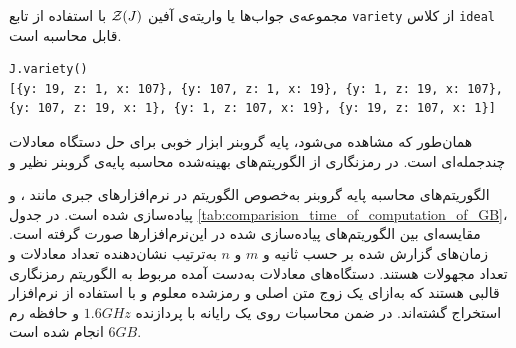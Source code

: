 \begin{example}
	مجموعه‌ی جواب‌ها یا واریته‌ی آفین 
${\mathcal Z}(J)$
	با استفاده از تابع 
\verb|variety|
	از کلاس 
\verb|ideal|
	قابل محاسبه است.
\begin{latin}
\begin{lstlisting}
J.variety()
[{y: 19, z: 1, x: 107}, {y: 107, z: 1, x: 19}, {y: 1, z: 19, x: 107},
{y: 107, z: 19, x: 1}, {y: 1, z: 107, x: 19}, {y: 19, z: 107, x: 1}]
\end{lstlisting}
\end{latin}	
\end{example}
همان‌طور که مشاهده می‌شود، پایه‌  گروبنر ابزار خوبی برای حل دستگاه‌ معادلات چندجمله‌ای است. در رمزنگاری از الگوریتم‌های بهینه‌شده محاسبه‌  پایه‌ی گروبنر  نظیر 
و

الگوریتم‌های محاسبه پایه گروبنر به‌خصوص  الگوریتم 
در نرم‌افزارهای جبری مانند 
\cite{Maple}، 
\cite{DGPS}
و 
\cite{ApCoCoA}
پیاده‌سازی شده است.  در جدول 
\ref{tab:comparision_time_of_computation_of_GB}، 
مقایسه‌ای بین الگوریتم‌های پیاده‌سازی شده در این‌نرم‌افزارها صورت گرفته است. زمان‌های گزارش شده بر حسب ثانیه و 
$m$
و 
$n$
به‌ترتیب نشان‌دهنده تعداد معادلات و تعداد مجهولات هستند.  دستگاه‌های معادلات به‌دست آمده مربوط به الگوریتم رمزنگاری قالبی 
هستند  که  به‌ازای یک زوج متن اصلی و رمزشده معلوم و  با استفاده از نرم‌افزار 
\cite{sagemath}
استخراج گشته‌اند.   در ضمن محاسبات روی یک رایانه با پردازنده 
$1.6GHz$
و حافظه رم 
$6GB$
انجام شده است. 

